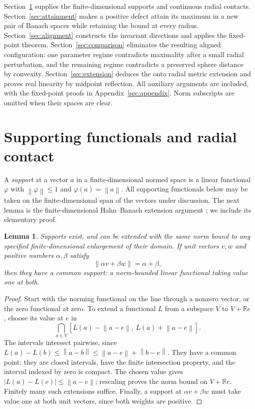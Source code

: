\documentclass[11pt]{article}
\newtheorem{lemma}[theorem]{Lemma}
\theoremstyle{remark}
\newcommand{\R}{\mathbb R}
\newcommand{\norm}[1]{\left\lVert#1\right\rVert}
\begin{document}
Section~\ref{sec:supports} supplies the finite-dimensional supports and continuous radial contacts. Section~\ref{sec:attainment} makes a positive defect attain its maximum in a new pair of Banach spaces while retaining the bound at every radius. Section~\ref{sec:alignment} constructs the invariant directions and applies the fixed-point theorem. Section~\ref{sec:comparison} eliminates the resulting aligned configuration: one parameter regime contradicts maximality after a small radial perturbation, and the remaining regime contradicts a preserved sphere distance by convexity. Section~\ref{sec:extension} deduces the onto radial metric extension and proves real linearity by midpoint reflection. All auxiliary arguments are included, with the fixed-point proofs in Appendix~\ref{sec:appendix}. Norm subscripts are omitted when their spaces are clear.

\section{Supporting functionals and radial contact}\label{sec:supports}

A \emph{support} at a vector $a$ in a finite-dimensional normed space is a linear functional $\varphi$ with $\norm{\varphi}\le1$ and $\varphi(a)=\norm{a}$. All supporting functionals below may be taken on the finite-dimensional span of the vectors under discussion. The next lemma is the finite-dimensional Hahn--Banach extension argument \cite{Banach1929}; we include its elementary proof.

\begin{lemma}\label{lem:support}
Supports exist, and can be extended with the same norm bound to any specified finite-dimensional enlargement of their domain. If unit vectors $v,w$ and positive numbers $\alpha,\beta$ satisfy
\[
\norm{\alpha v+\beta w}=\alpha+\beta,
\]
then they have a common support: a norm-bounded linear functional taking value one at both.
\end{lemma}
\begin{proof}
Start with the norming functional on the line through a nonzero vector, or the zero functional at zero. To extend a functional $L$ from a subspace $V$ to $V+\R e$, choose its value at $e$ in
\[
\bigcap_{a\in V}[L(a)-\norm{a-e},\ L(a)+\norm{a-e}].
\]
The intervals intersect pairwise, since
$L(a)-L(b)\le\norm{a-b}\le\norm{a-e}+\norm{b-e}$.
They have a common point: they are closed intervals, have the finite intersection property, and the interval indexed by zero is compact. The chosen value gives $|L(a)-L(e)|\le\norm{a-e}$; rescaling proves the norm bound on $V+\R e$. Finitely many such extensions suffice. Finally, a support at $\alpha v+\beta w$ must take value one at both unit vectors, since both weights are positive.
\end{proof}
\end{document}
